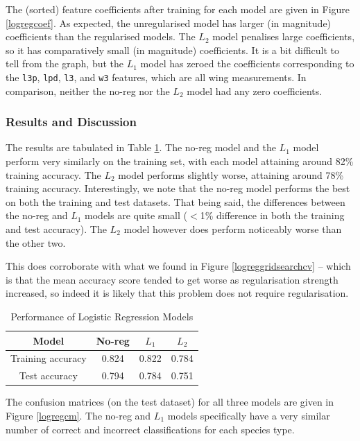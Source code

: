 The (sorted) feature coefficients after training for each model are given in Figure \ref{logregcoef}. As expected, the unregularised model has larger (in magnitude) coefficients than the regularised models. The $L_2$ model penalises large coefficients, so it has comparatively small (in magnitude) coefficients. It is a bit difficult to tell from the graph, but the $L_1$ model has zeroed the coefficients corresponding to the \texttt{l3p}, \texttt{lpd}, \texttt{l3}, and \texttt{w3} features, which are all wing measurements. In comparison, neither the no-reg nor the $L_2$ model had any zero coefficients.

\subsubsection{Results and Discussion}

The results are tabulated in Table \ref{logregperformance}. The no-reg model and the $L_1$ model perform very similarly on the training set, with each model attaining around 82\% training accuracy. The $L_2$ model performs slightly worse, attaining around 78\% training accuracy. Interestingly, we note that the no-reg model performs the best on both the training and test datasets. That being said, the differences between the no-reg and $L_1$ models are quite small ($<$1\% difference in both the training and test accuracy). The $L_2$ model however does perform noticeably worse than the other two.

This does corroborate with what we found in Figure \ref{logreggridsearchcv} -- which is that the mean accuracy score tended to get worse as regularisation strength increased, so indeed it is likely that this problem does not require regularisation.

\begin{table}[!ht]
\begin{center}
\begin{tabular}{|c|c|c|c|}
\hline
Model             & No-reg & $L_1$ & $L_2$ \\ \hline
Training accuracy & 0.824  & 0.822 & 0.784 \\ \hline
Test accuracy     & 0.794  & 0.784 & 0.751 \\ \hline
\end{tabular}
\end{center}
\caption{Performance of Logistic Regression Models}
\label{logregperformance}
\end{table}

The confusion matrices (on the test dataset) for all three models are given in Figure \ref{logregcm}. The no-reg and $L_1$ models specifically have a very similar number of correct and incorrect classifications for each species type.


